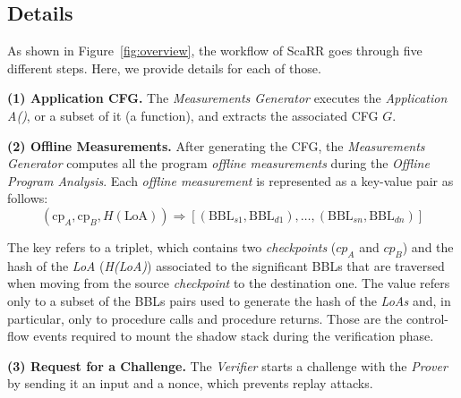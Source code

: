 \subsection{Details}
\label{ssec:scarr_details}

As shown in Figure~\ref{fig:overview}, the workflow of ScaRR goes through five 
different steps.
Here, we provide details for each of those.

\textbf{(1) Application CFG.} 
The \emph{Measurements Generator} executes the \emph{Application A()}, or a 
subset of it (\eg a function), and extracts the associated CFG $G$. 

\textbf{(2) Offline Measurements.} 
After generating the CFG, the \emph{Measurements Generator} computes all the 
program \emph{offline measurements} during the \emph{Offline Program Analysis}. 
Each \emph{offline measurement} is represented as a key-value pair as follows: 
$$
(\text{cp}_A,\text{cp}_B,H(\text{LoA})) \Rightarrow 
[(\text{BBL}_{s1},\text{BBL}_{d1}), \dots, (\text{BBL}_{sn},\text{BBL}_{dn})]
$$

The key refers to a triplet, which contains two \emph{checkpoints} (\ie $cp_A$ 
and $cp_B$) and the hash of the \emph{LoA} (\ie \emph{H(LoA)}) associated to 
the significant BBLs that are traversed when moving from the source 
\emph{checkpoint} to the destination one. The value refers only to a subset of 
the BBLs pairs used to generate the hash of the \emph{LoAs} and, in particular, 
only to procedure calls and procedure returns. Those are the control-flow 
events required to mount the shadow stack during the verification phase.


\textbf{(3) Request for a Challenge.}  
The \emph{Verifier} starts a challenge with the \emph{Prover} by sending it an 
input and a nonce, which prevents replay attacks. 


